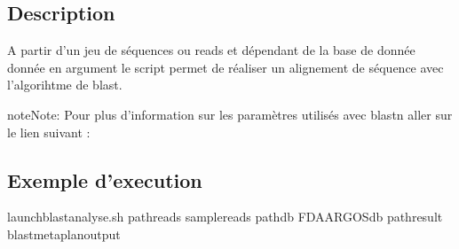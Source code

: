 \documentclass[letterpaper,10pt,french]{sphinxmanual}
\begin{document}
\subsection{Description}
\label{\detokenize{bash/launch_blast_analyse.sh:description}}
A partir d’un jeu de séquences ou reads et dépendant de la base de donnée donnée en argument le script permet de réaliser un alignement de séquence avec l’algorihtme de blast.

\begin{sphinxadmonition}{note}{Note:}
Pour plus d’information sur les paramètres utilisés avec blastn aller sur le lien suivant : 
\end{sphinxadmonition}


\subsection{Exemple d’execution}
\label{\detokenize{bash/launch_blast_analyse.sh:exemple-d-execution}}
\begin{sphinxVerbatim}[commandchars=\\\{\}]
launch\PYGZus{}blast\PYGZus{}analyse.sh \PYGZhy{}path\PYGZus{}reads sample\PYGZus{}reads \PYGZhy{}path\PYGZus{}db FDA\PYGZus{}ARGOS\PYGZus{}db \PYGZhy{}path\PYGZus{}result blast\PYGZus{}metaplan\PYGZus{}output
\end{sphinxVerbatim}
\end{document}
